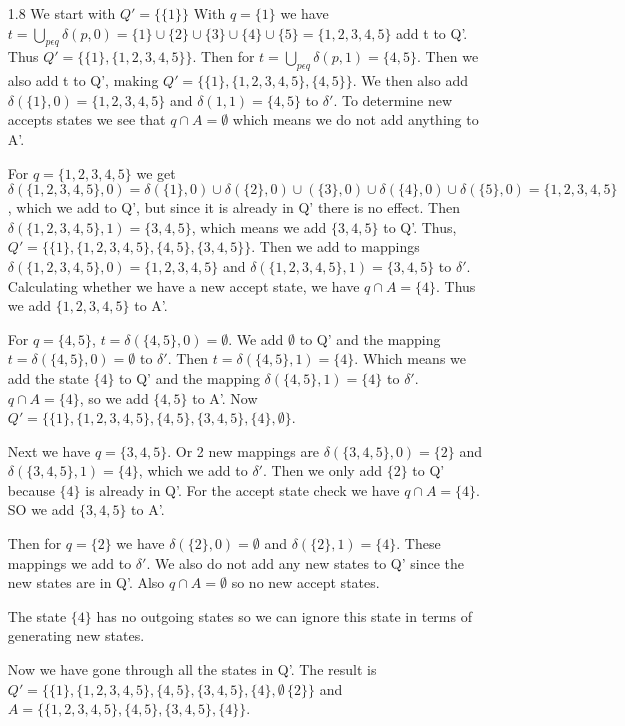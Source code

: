 \documentclass[10pt,a4paper]{article}
\begin{document}
\begin{enumerate}[leftmargin=\labelsep]
\item[1.8] We start with $Q' = \{\{1\}\}$ \newline
With $q=\{1\} $ we have $t=\bigcup_{p\epsilon q}\delta(p,0) = \{1\}\cup\{2\}\cup\{3\}\cup\{4\}\cup\{5\} = \{1,2,3,4,5\}$ add t to Q'. Thus $Q'=\{\{1\},\{1,2,3,4,5\}\}$. Then for $t=\bigcup_{p\epsilon q}\delta(p,1) = \{4,5\}$. Then we also add t to Q', making $Q'=\{\{1\},\{1,2,3,4,5\},\{4,5\}\}$. We then also add $\delta(\{1\},0)=\{1,2,3,4,5\}$ and $\delta({1},1)=\{4,5\}$ to $\delta'$. To determine new accepts states we see that $q\cap A = \emptyset$ which means we do not add anything to A'. 

For $q=\{1,2,3,4,5\}$ we get $\delta(\{1,2,3,4,5\},0)=\delta(\{1\},0)\cup\delta(\{2\},0)\cup(\{3\},0)\cup\delta(\{4\},0)\cup\delta(\{5\},0)=\{1,2,3,4,5\}$, which we add to Q', but since it is already in Q' there is no effect. Then $\delta(\{1,2,3,4,5\},1) = \{3,4,5\}$, which means we add $\{3,4,5\}$ to Q'. Thus, $Q'=\{\{1\},\{1,2,3,4,5\},\{4,5\},\{3,4,5\}\}$. Then we add to mappings $\delta(\{1,2,3,4,5\},0)=\{1,2,3,4,5\}$ and $\delta(\{1,2,3,4,5\},1) = \{3,4,5\}$ to $\delta'$. Calculating whether we have a new accept state, we have $q\cap A = \{4\}$. Thus we add $\{1,2,3,4,5\}$ to A'.

For $q=\{4,5\}$, $t=\delta(\{4,5\},0)=\emptyset$. We add $\emptyset$ to Q' and the mapping 
$t=\delta(\{4,5\},0)=\emptyset$ to $\delta'$. Then $t=\delta(\{4,5\},1)=\{4\}$. Which means we add the state $\{4\}$ to Q' and the mapping $\delta(\{4,5\},1)=\{4\}$ to $\delta'$. $q\cap A =\{4\}$, so we add $\{4,5\}$ to A'. Now  $Q'=\{\{1\},\{1,2,3,4,5\},\{4,5\},\{3,4,5\},\{4\},\emptyset\}$.

Next we have $q=\{3,4,5\}$. Or 2 new mappings are $\delta(\{3,4,5\},0)= \{2\}$ and $\delta(\{3,4,5\},1)=\{4\}$, which we add to $\delta'$. Then we only add $\{2\}$ to Q' because $\{4\}$ is already in Q'. For the accept state check we have $q\cap A = \{4\}$. SO we add $\{3,4,5\}$ to A'.

Then for $q=\{2\}$ we have $\delta(\{2\},0)=\emptyset$ and $\delta(\{2\},1) = \{4\}$. These mappings we add to $\delta'$. We also do not add any new states to Q' since the new states are in Q'. Also $q\cap A = \emptyset$ so no new accept states.

The state $\{4\}$ has no outgoing states so we can ignore this state in terms of generating new states.

Now we have gone through all the states in Q'. The result is \newline $Q'=\{\{1\},\{1,2,3,4,5\},\{4,5\},\{3,4,5\}, \{4\},\emptyset\,\{2\}\}$ and \newline $A=\{\{1,2,3,4,5\},\{4,5\},\{3,4,5\},\{4\}\}$.


\end{enumerate}
\end{document}

